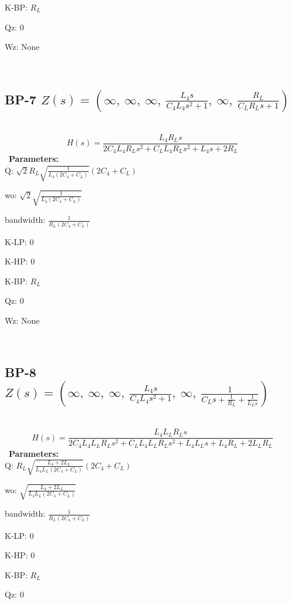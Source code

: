 \documentclass{article}
\begin{document}
K-BP: $R_{L}$\ 

Qz: $0$\ 

Wz: $\text{None}$\ 

\ 

\subsection{BP-7 $Z(s) = \left( \infty, \  \infty, \  \infty, \  \frac{L_{4} s}{C_{4} L_{4} s^{2} + 1}, \  \infty, \  \frac{R_{L}}{C_{L} R_{L} s + 1}\right)$ } \ 
\textbf{\[H(s) = \frac{L_{4} R_{L} s}{2 C_{4} L_{4} R_{L} s^{2} + C_{L} L_{4} R_{L} s^{2} + L_{4} s + 2 R_{L}}\] } \ 
\textbf{Parameters:}\\ 

Q: $\sqrt{2} R_{L} \sqrt{\frac{1}{L_{4} \left(2 C_{4} + C_{L}\right)}} \left(2 C_{4} + C_{L}\right)$\ 

wo: $\sqrt{2} \sqrt{\frac{1}{L_{4} \left(2 C_{4} + C_{L}\right)}}$\ 

bandwidth: $\frac{1}{R_{L} \left(2 C_{4} + C_{L}\right)}$\ 

K-LP: $0$\ 

K-HP: $0$\ 

K-BP: $R_{L}$\ 

Qz: $0$\ 

Wz: $\text{None}$\ 

\ 

\subsection{BP-8 $Z(s) = \left( \infty, \  \infty, \  \infty, \  \frac{L_{4} s}{C_{4} L_{4} s^{2} + 1}, \  \infty, \  \frac{1}{C_{L} s + \frac{1}{R_{L}} + \frac{1}{L_{L} s}}\right)$ } \ 
\textbf{\[H(s) = \frac{L_{4} L_{L} R_{L} s}{2 C_{4} L_{4} L_{L} R_{L} s^{2} + C_{L} L_{4} L_{L} R_{L} s^{2} + L_{4} L_{L} s + L_{4} R_{L} + 2 L_{L} R_{L}}\] } \ 
\textbf{Parameters:}\\ 

Q: $R_{L} \sqrt{\frac{L_{4} + 2 L_{L}}{L_{4} L_{L} \left(2 C_{4} + C_{L}\right)}} \left(2 C_{4} + C_{L}\right)$\ 

wo: $\sqrt{\frac{L_{4} + 2 L_{L}}{L_{4} L_{L} \left(2 C_{4} + C_{L}\right)}}$\ 

bandwidth: $\frac{1}{R_{L} \left(2 C_{4} + C_{L}\right)}$\ 

K-LP: $0$\ 

K-HP: $0$\ 

K-BP: $R_{L}$\ 

Qz: $0$\ 
\end{document}
